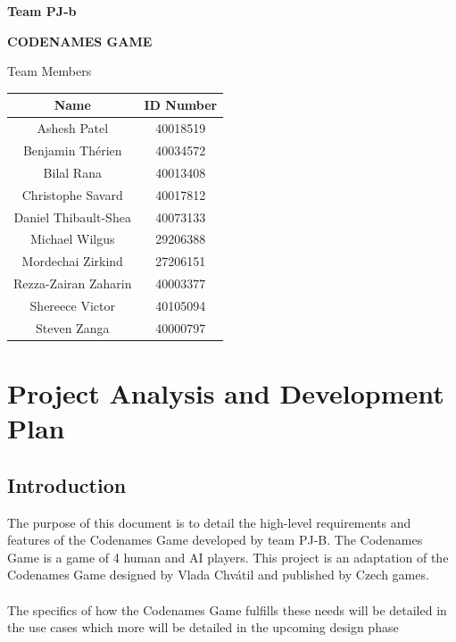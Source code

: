 \documentclass[10pt, a4paper]{article}
\begin{document}
	
	
	
	\hrulefill
	\begin{flushright}
		\textbf{Team PJ-b}
	\end{flushright}
	\hrulefill
	
	\vspace*{0.5in}
	\centerline{\bf\Large CODENAMES GAME}
	
	\vspace*{1.5in}
	
	
	\begin{table}[htbp] 
		\begin{center} 
			\begin{center} 
				Team Members\\
				
			\end{center} 
			\begin{tabular}{| c | c |} 
				\hline 
				Name & ID Number \\ 
				\hline\hline 
				Ashesh Patel & 40018519 \\ 
				Benjamin Th\'erien & 40034572\\ 
				Bilal Rana & 40013408 \\
				Christophe Savard & 40017812\\
				Daniel Thibault-Shea & 40073133\\ 
				Michael Wilgus & 29206388 \\ 
				Mordechai Zirkind & 27206151\\
				Rezza-Zairan Zaharin & 40003377 \\
				Shereece Victor & 40105094\\ 
				Steven Zanga & 40000797\\ 
				
				\hline 
			\end{tabular} 
		\end{center} 
	\end{table} 
	
	\newpage 
	\newpage 
	
	\section{Project Analysis and Development Plan}
	
	\subsection{Introduction}
	
	The purpose of this document is to detail the high-level requirements and features of the Codenames Game developed by team PJ-B. The Codenames Game is a game of 4 human and AI players. This project is an adaptation of the Codenames Game designed by Vlada Chv\'atil and published by Czech games.\\
	\\
	The specifics of how the Codenames Game fulfills these needs will be detailed in the use cases which more will be detailed in the upcoming design phase\\
	
\end{document}
